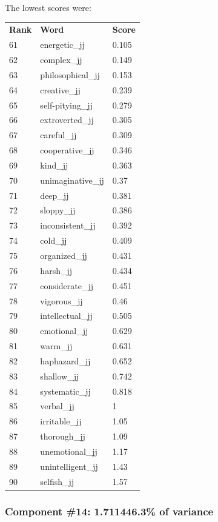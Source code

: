 \documentclass[10pt,letterpaper]{book}
\begin{document}
The lowest scores were:
\begin{tabular}{ l l l }
        \textbf{Rank} & \textbf{Word} & \textbf{Score} \\
        61 & energetic\_jj & 0.105 \\
        62 & complex\_jj & 0.149 \\
        63 & philosophical\_jj & 0.153 \\
        64 & creative\_jj & 0.239 \\
        65 & self-pitying\_jj & 0.279 \\
        66 & extroverted\_jj & 0.305 \\
        67 & careful\_jj & 0.309 \\
        68 & cooperative\_jj & 0.346 \\
        69 & kind\_jj & 0.363 \\
        70 & unimaginative\_jj & 0.37 \\
        71 & deep\_jj & 0.381 \\
        72 & sloppy\_jj & 0.386 \\
        73 & inconsistent\_jj & 0.392 \\
        74 & cold\_jj & 0.409 \\
        75 & organized\_jj & 0.431 \\
        76 & harsh\_jj & 0.434 \\
        77 & considerate\_jj & 0.451 \\
        78 & vigorous\_jj & 0.46 \\
        79 & intellectual\_jj & 0.505 \\
        80 & emotional\_jj & 0.629 \\
        81 & warm\_jj & 0.631 \\
        82 & haphazard\_jj & 0.652 \\
        83 & shallow\_jj & 0.742 \\
        84 & systematic\_jj & 0.818 \\
        85 & verbal\_jj & 1 \\
        86 & irritable\_jj & 1.05 \\
        87 & thorough\_jj & 1.09 \\
        88 & unemotional\_jj & 1.17 \\
        89 & unintelligent\_jj & 1.43 \\
        90 & selfish\_jj & 1.57 \\
\end{tabular}
\subsubsection{Component \#14: 1.711446.3\% of variance}
\end{document}

